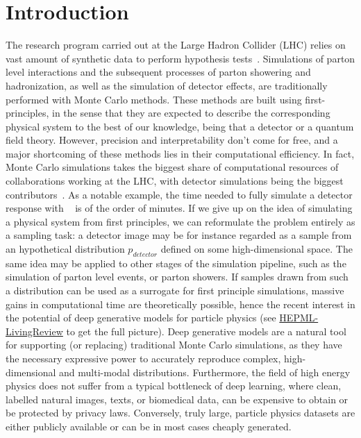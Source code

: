 
\chapter{Introduction}\label{chap:introduction}
\enlargethispage{2ex}
\vspace*{-2pt}

The research program carried out at the Large Hadron Collider (LHC) relies on vast amount of synthetic data to perform hypothesis tests~\cite{Apostolakis:2308666, Aarrestad:2729448, Calafiura:2729668, ATL-SOFT-PUB-2018-002}. Simulations of parton level interactions and the subsequent processes of parton showering and hadronization, as well as the simulation of detector effects, are traditionally performed with Monte Carlo methods. These methods are built using first-principles, in the sense that they are expected to describe the corresponding physical system to the best of our knowledge, being that a detector or a quantum field theory. 
However, precision and interpretability don't come for free, and a major shortcoming of these methods lies in their computational efficiency. In fact, Monte Carlo simulations takes the biggest share of computational resources of collaborations working at the LHC, with detector simulations being the biggest contributors~\cite{Calafiura:2729668}. As a notable example, the time needed to fully simulate a detector response with \geant~\cite{AGOSTINELLI2003250} is of the order of minutes.
If we give up on the idea of simulating a physical system from first principles, we can reformulate the problem entirely as a sampling task: a detector image may be for instance regarded as a sample from an hypothetical distribution $p_{detector}$ defined on some high-dimensional space. The same idea may be applied to other stages of the simulation pipeline, such as the simulation of parton level events, or parton showers.
If samples drawn from such a distribution can be used as a surrogate for first principle simulations, massive gains in computational time are theoretically possible, hence the recent interest in the potential of deep generative models for particle physics (see \href{https://iml-wg.github.io/HEPML-LivingReview}{HEPML-LivingReview} to get the full picture).
\medskip
Deep generative models are a natural tool for supporting  (or replacing) traditional Monte Carlo simulations, as they have the necessary expressive power to accurately reproduce complex, high-dimensional and multi-modal distributions. Furthermore, the field of high energy physics does not suffer from a typical bottleneck of deep learning, where clean, labelled natural images, texts, or biomedical data, can be expensive to obtain or be protected by privacy laws. Conversely, truly large, particle physics datasets are either publicly available or can be in most cases cheaply generated.
